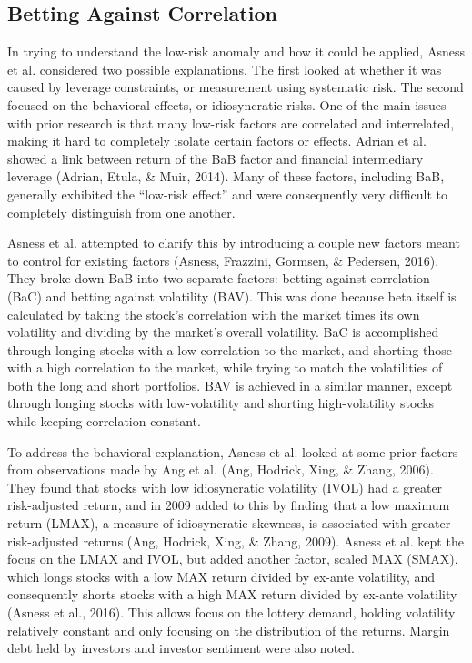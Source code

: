 \documentclass[12pt,twoside]{reedthesis}
\theoremstyle{definition}
\theoremstyle{definition}
\theoremstyle{definition}
\theoremstyle{remark}
\begin{document}
\subsection{Betting Against
Correlation}\label{betting-against-correlation}

In trying to understand the low-risk anomaly and how it could be
applied, Asness et al. considered two possible explanations. The first
looked at whether it was caused by leverage constraints, or measurement
using systematic risk. The second focused on the behavioral effects, or
idiosyncratic risks. One of the main issues with prior research is that
many low-risk factors are correlated and interrelated, making it hard to
completely isolate certain factors or effects. Adrian et al. showed a
link between return of the BaB factor and financial intermediary
leverage (Adrian, Etula, \& Muir, 2014). Many of these factors,
including BaB, generally exhibited the ``low-risk effect'' and were
consequently very difficult to completely distinguish from one another.

Asness et al. attempted to clarify this by introducing a couple new
factors meant to control for existing factors (Asness, Frazzini,
Gormsen, \& Pedersen, 2016). They broke down BaB into two separate
factors: betting against correlation (BaC) and betting against
volatility (BAV). This was done because beta itself is calculated by
taking the stock's correlation with the market times its own volatility
and dividing by the market's overall volatility. BaC is accomplished
through longing stocks with a low correlation to the market, and
shorting those with a high correlation to the market, while trying to
match the volatilities of both the long and short portfolios. BAV is
achieved in a similar manner, except through longing stocks with
low-volatility and shorting high-volatility stocks while keeping
correlation constant.

To address the behavioral explanation, Asness et al. looked at some
prior factors from observations made by Ang et al. (Ang, Hodrick, Xing,
\& Zhang, 2006). They found that stocks with low idiosyncratic
volatility (IVOL) had a greater risk-adjusted return, and in 2009 added
to this by finding that a low maximum return (LMAX), a measure of
idiosyncratic skewness, is associated with greater risk-adjusted returns
(Ang, Hodrick, Xing, \& Zhang, 2009). Asness et al. kept the focus on
the LMAX and IVOL, but added another factor, scaled MAX (SMAX), which
longs stocks with a low MAX return divided by ex-ante volatility, and
consequently shorts stocks with a high MAX return divided by ex-ante
volatility (Asness et al., 2016). This allows focus on the lottery
demand, holding volatility relatively constant and only focusing on the
distribution of the returns. Margin debt held by investors and investor
sentiment were also noted.
\end{document}
